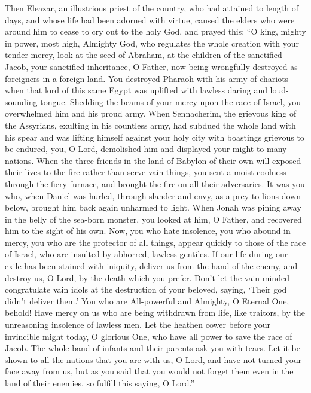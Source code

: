  Then Eleazar, an illustrious priest of the country, who had
attained to length of days, and whose life had been adorned with virtue,
caused the elders who were around him to cease to cry out to the holy
God, and prayed this:  ``O king, mighty in power, most high,
Almighty God, who regulates the whole creation with your tender mercy,
 look at the seed of Abraham, at the children of the
sanctified Jacob, your sanctified inheritance, O Father, now being
wrongfully destroyed as foreigners in a foreign land.  You
destroyed Pharaoh with his army of chariots when that lord of this same
Egypt was uplifted with lawless daring and loud-sounding tongue.
Shedding the beams of your mercy upon the race of Israel, you
overwhelmed him and his proud army.  When Sennacherim, the
grievous king of the Assyrians, exulting in his countless army, had
subdued the whole land with his spear and was lifting himself against
your holy city with boastings grievous to be endured, you, O Lord,
demolished him and displayed your might to many nations. 
When the three friends in the land of Babylon of their own will exposed
their lives to the fire rather than serve vain things, you sent a moist
coolness through the fiery furnace, and brought the fire on all their
adversaries.  It was you who, when Daniel was hurled,
through slander and envy, as a prey to lions down below, brought him
back again unharmed to light.  When Jonah was pining away in
the belly of the sea-born monster, you looked at him, O Father, and
recovered him to the sight of his own.  Now, you who hate
insolence, you who abound in mercy, you who are the protector of all
things, appear quickly to those of the race of Israel, who are insulted
by abhorred, lawless gentiles.  If our life during our
exile has been stained with iniquity, deliver us from the hand of the
enemy, and destroy us, O Lord, by the death which you prefer.
 Don't let the vain-minded congratulate vain idols at the
destruction of your beloved, saying, `Their god didn't deliver them.'
 You who are All-powerful and Almighty, O Eternal One,
behold! Have mercy on us who are being withdrawn from life, like
traitors, by the unreasoning insolence of lawless men.  Let
the heathen cower before your invincible might today, O glorious One,
who have all power to save the race of Jacob.  The whole
band of infants and their parents ask you with tears.  Let
it be shown to all the nations that you are with us, O Lord, and have
not turned your face away from us, but as you said that you would not
forget them even in the land of their enemies, so fulfill this saying, O
Lord.''

